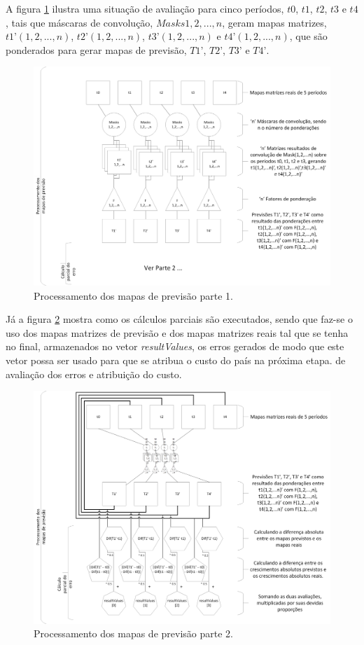 A figura \ref{fig:ForecastEvalPart0}  ilustra uma situação de avaliação para cinco períodos, \(t0\), \(t1\), \(t2\), \(t3\) e \(t4\), tais que máscaras de convolução, \(Masks 1,2,...,n\), geram mapas matrizes, \(t1’(1,2,...,n)\), \(t2’(1,2,...,n)\), \(t3’(1,2,...,n)\) e \(t4’(1,2,...,n)\), que são ponderados para gerar mapas de previsão, \(T1’\), \(T2’\), \(T3’\) e \(T4’\).

\begin{figure}[h]
	\centering	\includegraphics[scale=0.55]{Figuras/Ilustrations-ForecastEvalPart0.png}
	\caption{Processamento dos mapas de previsão parte 1.}
	\label{fig:ForecastEvalPart0}
\end{figure}

Já a figura \ref{fig:ForecastEvalPart1}  mostra como os cálculos parciais são executados, sendo que faz-se o uso dos mapas matrizes de previsão e dos mapas matrizes reais tal que se tenha no final, armazenados no vetor \emph{resultValues}, os erros gerados de modo que este vetor possa ser usado para que se atribua o custo do país na próxima etapa. de avaliação dos erros e atribuição do custo.

\begin{figure}[h]
	\centering	\includegraphics[scale=0.55]{Figuras/Ilustrations-ForecastEvalPart1.png}
	\caption{Processamento dos mapas de previsão parte 2.}
	\label{fig:ForecastEvalPart1}
\end{figure}

